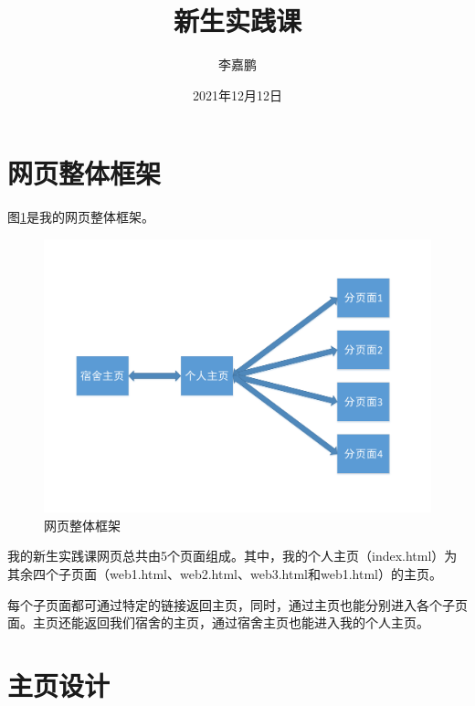 \documentclass[supercite]{Experimental_Report}
\title{~~~~~~新生实践课~~~~~~}
\author{李嘉鹏}
\date{2021年12月12日}
\theoremstyle{definition}
\begin{document}
	
	\maketitle
	
	\clearpage
	
	
	\tableofcontents[level=2]
	\clearpage
	
	
	\section{网页整体框架}
	
	图\ref{fig1-1}是我的网页整体框架。
	
	\begin{figure}[htb] %
		\begin{center}
			\includegraphics[scale=0.50]{images/1-1.pdf}
			\caption{网页整体框架}
			\label{fig1-1}
		\end{center}
	\end{figure}
	
	
	我的新生实践课网页总共由5个页面组成。其中，我的个人主页（index.html）为其余四个子页面（web1.html、web2.html、web3.html和web1.html）的主页。
	
	每个子页面都可通过特定的链接返回主页，同时，通过主页也能分别进入各个子页面。主页还能返回我们宿舍的主页，通过宿舍主页也能进入我的个人主页。
	
	\newpage
	
	\section{主页设计}
	
\end{document}
